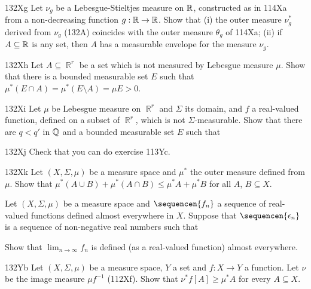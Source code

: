 {\sqheader 132Xg Let $\nu_g$ be a Lebesgue-Stieltjes measure on $\Bbb R$,
constructed as in 114Xa from a non-decreasing function
$g:\Bbb R\to\Bbb R$.   Show that
(i) the outer measure $\nu_g^*$ derived from $\nu_g$ (132A)
coincides with the outer measure $\theta_g$ of 114Xa;
(ii) if $A\subseteq\Bbb R$ is any set, then $A$ has a
measurable envelope for the measure $\nu_g$.

\sqheader 132Xh Let $A\subseteq\BbbR^r$ be a set which is not
measured by Lebesgue measure $\mu$.   Show that there is a bounded
measurable set $E$ such that $\mu^*(E\cap A)=\mu^*(E\setminus A)=\mu E>0$.

\spheader 132Xi Let $\mu$ be Lebesgue measure on $\BbbR^r$ and
$\Sigma$ its domain, and $f$ a real-valued function, defined on a subset
of $\BbbR^r$, which is not $\Sigma$-measurable.
Show that there are  $q<q'$ in $\Bbb Q$ and a bounded measurable set
$E$ such that


\noindent {}

\spheader 132Xj Check that you can do exercise 113Yc.

\spheader 132Xk Let $(X,\Sigma,\mu)$ be a measure space and $\mu^*$ the
outer measure defined from $\mu$.
Show that $\mu^*(A\cup B)+\mu^*(A\cap B)\le\mu^*A+\mu^*B$
for all $A$, $B\subseteq X$.

Let $(X,\Sigma,\mu)$ be a measure space and $\sequencen{f_n}$
a sequence of real-valued functions defined almost everywhere in $X$.
Suppose that $\sequencen{\epsilon_n}$ is a sequence of
non-negative real numbers such that


\noindent Show that $\lim_{n\to\infty}f_n$ is defined (as a
real-valued function) almost everywhere.

\spheader 132Yb Let $(X,\Sigma,\mu)$ be a measure space, $Y$ a set and
$f:X\to Y$ a function.   Let $\nu$ be the image measure $\mu f^{-1}$
(112Xf).   Show that $\nu^*f[A]\ge\mu^*A$ for every $A\subseteq X$.

}
